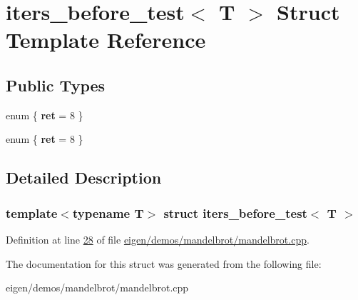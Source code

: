 \hypertarget{structiters__before__test}{}\section{iters\+\_\+before\+\_\+test$<$ T $>$ Struct Template Reference}
\label{structiters__before__test}
\subsection*{Public Types}
\begin{DoxyCompactItemize}
\item 
\mbox{\label{structiters__before__test_a19835c73f09a3f22c02acdb46b9af6cc}} 
enum \{ {\bfseries ret} = 8
 \}
\item 
\mbox{\label{structiters__before__test_a12cfc2d276dde11b1ea8de8c7570f64d}} 
enum \{ {\bfseries ret} = 8
 \}
\end{DoxyCompactItemize}


\subsection{Detailed Description}
\subsubsection*{template$<$typename T$>$\newline
struct iters\+\_\+before\+\_\+test$<$ T $>$}



Definition at line \hyperlink{eigen_2demos_2mandelbrot_2mandelbrot_8cpp_source_l00028}{28} of file \hyperlink{eigen_2demos_2mandelbrot_2mandelbrot_8cpp_source}{eigen/demos/mandelbrot/mandelbrot.\+cpp}.



The documentation for this struct was generated from the following file\+:\begin{DoxyCompactItemize}
\item 
eigen/demos/mandelbrot/mandelbrot.\+cpp\end{DoxyCompactItemize}
